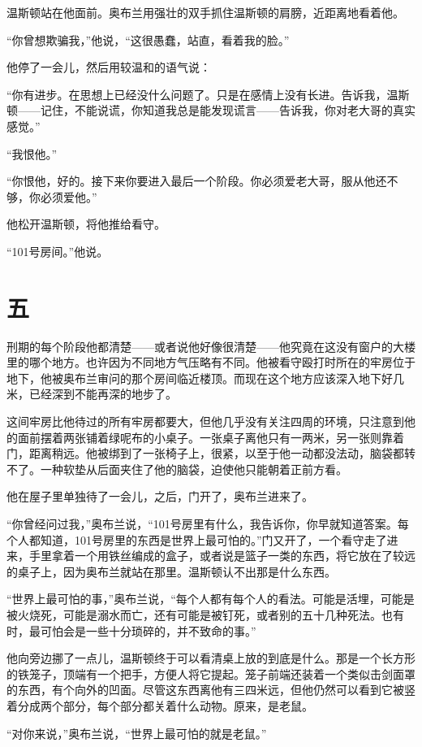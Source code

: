 温斯顿站在他面前。奥布兰用强壮的双手抓住温斯顿的肩膀，近距离地看着他。

``你曾想欺骗我，''他说，``这很愚蠢，站直，看着我的脸。''

他停了一会儿，然后用较温和的语气说：

``你有进步。在思想上已经没什么问题了。只是在感情上没有长进。告诉我，温斯顿——记住，不能说谎，你知道我总是能发现谎言——告诉我，你对老大哥的真实感觉。''

``我恨他。''

``你恨他，好的。接下来你要进入最后一个阶段。你必须爱老大哥，服从他还不够，你必须爱他。''

他松开温斯顿，将他推给看守。

``101号房间。''他说。

\section*{五}\label{ux4e8cux5341ux4e09}

刑期的每个阶段他都清楚——或者说他好像很清楚——他究竟在这没有窗户的大楼里的哪个地方。也许因为不同地方气压略有不同。他被看守殴打时所在的牢房位于地下，他被奥布兰审问的那个房间临近楼顶。而现在这个地方应该深入地下好几米，已经深到不能再深的地步了。

这间牢房比他待过的所有牢房都要大，但他几乎没有关注四周的环境，只注意到他的面前摆着两张铺着绿呢布的小桌子。一张桌子离他只有一两米，另一张则靠着门，距离稍远。他被绑到了一张椅子上，很紧，以至于他一动都没法动，脑袋都转不了。一种软垫从后面夹住了他的脑袋，迫使他只能朝着正前方看。

他在屋子里单独待了一会儿，之后，门开了，奥布兰进来了。

``你曾经问过我，''奥布兰说，``101号房里有什么，我告诉你，你早就知道答案。每个人都知道，101号房里的东西是世界上最可怕的。''门又开了，一个看守走了进来，手里拿着一个用铁丝编成的盒子，或者说是篮子一类的东西，将它放在了较远的桌子上，因为奥布兰就站在那里。温斯顿认不出那是什么东西。

``世界上最可怕的事，''奥布兰说，``每个人都有每个人的看法。可能是活埋，可能是被火烧死，可能是溺水而亡，还有可能是被钉死，或者别的五十几种死法。也有时，最可怕会是一些十分琐碎的，并不致命的事。''

他向旁边挪了一点儿，温斯顿终于可以看清桌上放的到底是什么。那是一个长方形的铁笼子，顶端有一个把手，方便人将它提起。笼子前端还装着一个类似击剑面罩的东西，有个向外的凹面。尽管这东西离他有三四米远，但他仍然可以看到它被竖着分成两个部分，每个部分都关着什么动物。原来，是老鼠。

``对你来说，''奥布兰说，``世界上最可怕的就是老鼠。''

